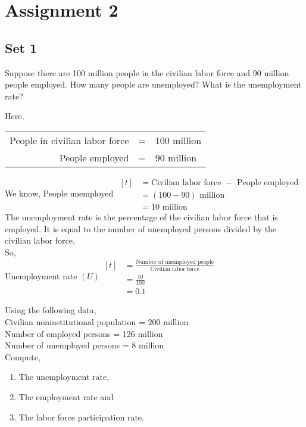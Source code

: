 \documentclass[12pt]{article}
\begin{document}
\section{Assignment 2}
\subsection{Set 1}
\begin{prob}
	Suppose there are 100 million people in the civilian labor force and 90 million people employed. How many people are unemployed? What is the unemployment rate?
\end{prob}
\begin{soln}Here,
	\begin{table}[H]
		\begin{tabular}{rcl}
			\hspace{3cm}People in civilian labor force & = & 100 million \\
			People employed                            & = & 90 million
		\end{tabular}
	\end{table}
	We know,
	People unemployed $\begin{aligned}[t]
			 & = \text{Civilian labor force } - \text{ People employed} \\
			 & = (100-90) \text{ million}                               \\
			 & = 10 \text{ million}
		\end{aligned}
	$\\
	The unemployment rate is the percentage of the civilian labor force that is employed. It is equal to the number of unemployed persons divided by the civilian labor force.\\
	So,\\
	Unemployment rate $ (U) \begin{aligned}[t]
			 & = \frac{\text{Number of unemployed people}}{\text{Civilian labor force}} \\
			 & = \frac{10}{100}                                                         \\
			 & = 0.1
		\end{aligned}
	$
\end{soln}
\newpage
\begin{prob}
	Using the following data,\\
	\indent Civilian noninstitutional population = 200 million\\
	\indent Number of employed persons = 126 million\\
	\indent Number of unemployed persons = 8 million\\
	Compute,
	\begin{enumerate}[label=(\alph*)]
		\item The unemployment rate,
		\item The employment rate and
		\item The labor force participation rate.
	\end{enumerate}
\end{prob}
\end{document}
